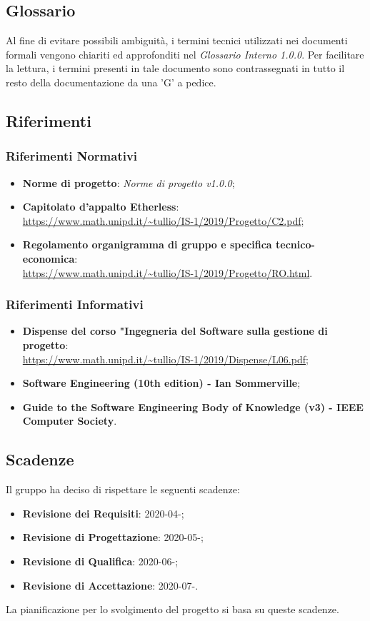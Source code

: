 \subsection{Glossario}
Al fine di evitare possibili ambiguità, i termini tecnici utilizzati nei documenti formali vengono chiariti ed approfonditi nel \textit{Glossario Interno 1.0.0}. Per facilitare la lettura, i termini presenti in tale documento sono contrassegnati in tutto il resto della documentazione da una 'G' a pedice.
\subsection{Riferimenti}
\subsubsection{Riferimenti Normativi}
\begin{itemize}
	\item \textbf{Norme di progetto}: \textit{Norme di progetto v1.0.0};
	\item \textbf{Capitolato d'appalto Etherless}:\\\url{https://www.math.unipd.it/~tullio/IS-1/2019/Progetto/C2.pdf};
	\item \textbf{Regolamento organigramma di gruppo e specifica tecnico-economica}:\\\url{https://www.math.unipd.it/~tullio/IS-1/2019/Progetto/RO.html}.
\end{itemize}
\subsubsection{Riferimenti Informativi}
\begin{itemize}
	\item \textbf{Dispense del corso "Ingegneria del Software sulla gestione di progetto}:\\\url{https://www.math.unipd.it/~tullio/IS-1/2019/Dispense/L06.pdf};
	\item \textbf{Software Engineering (10th edition) - Ian Sommerville};
	\item \textbf{Guide to the Software Engineering Body of Knowledge (v3) - IEEE Computer Society}.
\end{itemize}
\subsection{Scadenze}
Il gruppo \Gruppo{} ha deciso di rispettare le seguenti scadenze:
\begin{itemize}
	\item \textbf{Revisione dei Requisiti}: 2020-04-;
	\item \textbf{Revisione di Progettazione}: 2020-05-;
	\item \textbf{Revisione di Qualifica}: 2020-06-;
	\item \textbf{Revisione di Accettazione}: 2020-07-.
\end{itemize}
La pianificazione per lo svolgimento del progetto si basa su queste scadenze.